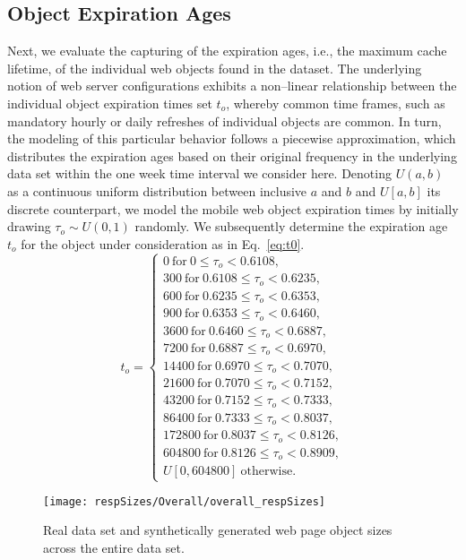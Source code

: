 \documentclass[letterpaper,conference]{IEEEtran}
\begin{document}
\subsection{Object Expiration Ages}
Next, we evaluate the capturing of the expiration ages, i.e., the maximum cache lifetime, of the individual web objects found in the dataset.
The underlying notion of web server configurations exhibits a non--linear relationship between the individual object expiration times set $t_o$, whereby common time frames, such as mandatory hourly or daily refreshes of individual objects are common. 
In turn, the modeling of this particular behavior follows a piecewise approximation, which distributes the expiration ages based on their original frequency in the underlying data set within the one week time interval we consider here.
Denoting $U(a,b)$ as a continuous uniform distribution between inclusive $a$ and $b$ and $U[a,b]$ its discrete counterpart, we model the mobile web object expiration times by initially drawing $\tau_o \sim U(0,1)$ randomly.
We subsequently determine the expiration age $t_o$ for the object under consideration as in Eq.~\ref{eq:t0}.
\begin{equation}\label{eq:t0}
t_o =
\begin{cases}
0 ~\mathrm{for}~ 0 \le \tau_o <  0.6108,\\
300 ~\mathrm{for}~ 0.6108 \le  \tau_o < 0.6235,\\
600 ~\mathrm{for}~ 0.6235 \le \tau_o < 0.6353,\\
900 ~\mathrm{for}~ 0.6353 \le \tau_o < 0.6460,\\
3600 ~\mathrm{for}~0.6460 \le \tau_o < 0.6887,\\
7200 ~\mathrm{for}~0.6887 \le \tau_o < 0.6970,\\
14400 ~\mathrm{for}~0.6970 \le \tau_o < 0.7070,\\
21600 ~\mathrm{for}~0.7070 \le \tau_o < 0.7152,\\
43200 ~\mathrm{for}~0.7152 \le \tau_o < 0.7333,\\
86400 ~\mathrm{for}~0.7333 \le \tau_o < 0.8037,\\
172800 ~\mathrm{for}~0.8037 \le \tau_o < 0.8126,\\
604800 ~\mathrm{for}~0.8126 \le \tau_o < 0.8909,\\
U[0, 604800]~\mathrm{otherwise}.
\end{cases}
\end{equation}

\begin{figure}[b!]
	\centering
	\texttt{[image: respSizes/Overall/overall\_respSizes]}
	\caption{Real data set and synthetically generated web page object sizes across the entire data set.}
	\label{fig:osize}
\end{figure}
\end{document}
